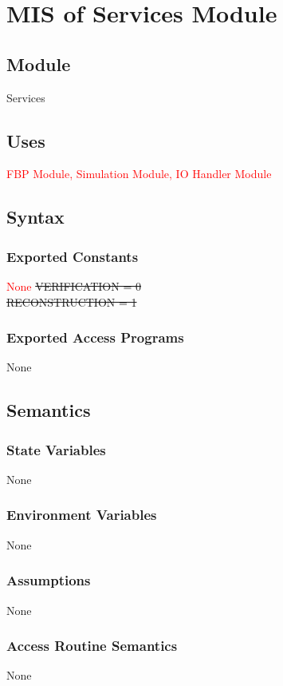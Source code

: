 \documentclass[12pt, titlepage]{article}
\newcommand{\add}{\textcolor{red}}
\begin{document}
\section{MIS of Services Module} \label{ModuleCon}

\subsection{Module}
Services

\subsection{Uses}
\add{FBP Module, Simulation Module, IO Handler Module}

\subsection{Syntax}

\subsubsection{Exported Constants}
\add{None}\st{
  VERIFICATION = 0\\
  RECONSTRUCTION = 1\\
}

\subsubsection{Exported Access Programs}
None

\subsection{Semantics}

\subsubsection{State Variables}
None

\subsubsection{Environment Variables}
None

\subsubsection{Assumptions}
None

\subsubsection{Access Routine Semantics}
None
\end{document}
